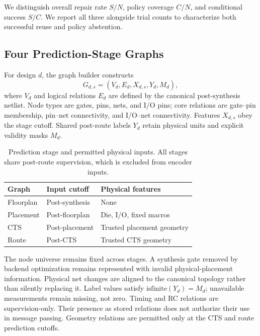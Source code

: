 We distinguish overall repair rate $S/N$, policy coverage $C/N$, and conditional success $S/C$. We report all three alongside trial counts to characterize both successful reuse and policy abstention.

\subsection{Four Prediction-Stage Graphs}
For design $d$, the graph builder constructs
\begin{equation}
G_{d,s}=(V_d,E_d,X_{d,s},Y_d,M_d),
\end{equation}
where $V_d$ and logical relations $E_d$ are defined by the canonical post-synthesis netlist. Node types are gates, pins, nets, and I/O pins; core relations are gate--pin membership, pin--net connectivity, and I/O--net connectivity. Features $X_{d,s}$ obey the stage cutoff. Shared post-route labels $Y_d$ retain physical units and explicit validity masks $M_d$.

\begin{table}[htbp]
\caption{Prediction stage and permitted physical inputs. All stages share post-route supervision, which is excluded from encoder inputs.}
\label{tab:cutoff}\centering
\begin{tabular}{lll}\toprule
Graph & Input cutoff & Physical features\\\midrule
Floorplan & Post-synthesis & None\\
Placement & Post-floorplan & Die, I/O, fixed macros\\
CTS & Post-placement & Trusted placement geometry\\
Route & Post-CTS & Trusted CTS geometry\\\bottomrule
\end{tabular}
\end{table}

The node universe remains fixed across stages. A synthesis gate removed by backend optimization remains represented with invalid physical-placement information. Physical net changes are aligned to the canonical topology rather than silently replacing it. Label values satisfy $\mathrm{isfinite}(Y_d)=M_d$; unavailable measurements remain missing, not zero. Timing and RC relations are supervision-only. Their presence as stored relations does not authorize their use in message passing. Geometry relations are permitted only at the CTS and route prediction cutoffs.

